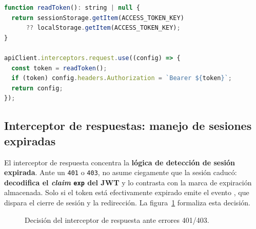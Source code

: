 \begin{lstlisting}[language=JavaScript, caption={Interceptor de petición: inyección del JWT (\texttt{apiClient.ts}).}, label={lst:req-interceptor}]
function readToken(): string | null {
  return sessionStorage.getItem(ACCESS_TOKEN_KEY)
      ?? localStorage.getItem(ACCESS_TOKEN_KEY);
}

apiClient.interceptors.request.use((config) => {
  const token = readToken();
  if (token) config.headers.Authorization = `Bearer ${token}`;
  return config;
});
\end{lstlisting}

\subsection{Interceptor de respuestas: manejo de sesiones expiradas}
\label{subsec:interceptor_resp}

El interceptor de respuesta concentra la \textbf{lógica de detección de sesión expirada}.
Ante un \texttt{401} o \texttt{403}, no asume ciegamente que la sesión caducó:
\textbf{decodifica el \textit{claim} \texttt{exp} del JWT} y lo contrasta con la marca de
expiración almacenada. Solo si el token está efectivamente expirado emite el evento
, que dispara el cierre de sesión y la redirección. La
figura~\ref{fig:flow-401} formaliza esta decisión.

\vspace{0.3cm}
\begin{figure}[h!]
\centering
{}
\caption{Decisión del interceptor de respuesta ante errores 401/403.}
\label{fig:flow-401}
\end{figure}

